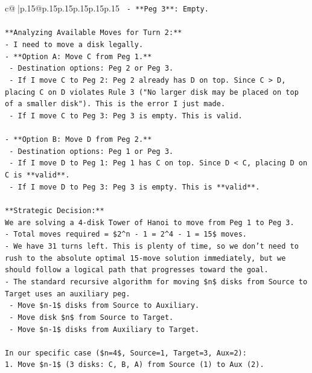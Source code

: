 \documentclass{article}
\begin{document}
{\begin{supertabular}{c@{$\;$}|p{.15\linewidth}@{}p{.15\linewidth}p{.15\linewidth}p{.15\linewidth}p{.15\linewidth}p{.15\linewidth}}
{{{\texttt{  {-} **Peg 3**: Empty.} \\
\\ 
\texttt{**Analyzing Available Moves for Turn 2:**} \\
\texttt{{-} I need to move a disk legally.} \\
\texttt{{-} **Option A: Move C from Peg 1.**} \\
\texttt{  {-} Destination options: Peg 2 or Peg 3.} \\
\texttt{  {-} If I move C to Peg 2: Peg 2 already has D on top. Since C > D, placing C on D violates Rule 3 ("No larger disk may be placed on top of a smaller disk"). This is the error I just made.} \\
\texttt{  {-} If I move C to Peg 3: Peg 3 is empty. This is valid.} \\
\\ 
\texttt{{-} **Option B: Move D from Peg 2.**} \\
\texttt{  {-} Destination options: Peg 1 or Peg 3.} \\
\texttt{  {-} If I move D to Peg 1: Peg 1 has C on top. Since D < C, placing D on C is **valid**.} \\
\texttt{  {-} If I move D to Peg 3: Peg 3 is empty. This is **valid**.} \\
\\ 
\texttt{**Strategic Decision:**} \\
\texttt{We are solving a 4{-}disk Tower of Hanoi to move from Peg 1 to Peg 3.} \\
\texttt{{-} Total moves required = \$2\^{}n {-} 1 = 2\^{}4 {-} 1 = 15\$ moves.} \\
\texttt{{-} We have 31 turns left. This is plenty of time, so we don't need to rush to the absolute optimal 15{-}move solution immediately, but we should follow a logical path that progresses toward the goal.} \\
\texttt{{-} The standard recursive algorithm for moving \$n\$ disks from Source to Target uses an auxiliary peg.} \\
\texttt{  {-} Move \$n{-}1\$ disks from Source to Auxiliary.} \\
\texttt{  {-} Move disk \$n\$ from Source to Target.} \\
\texttt{  {-} Move \$n{-}1\$ disks from Auxiliary to Target.} \\
\\ 
\texttt{In our specific case (\$n=4\$, Source=1, Target=3, Aux=2):} \\
\texttt{1. Move \$n{-}1\$ (3 disks: C, B, A) from Source (1) to Aux (2).} \\
}}}
\end{supertabular}}
\end{document}
